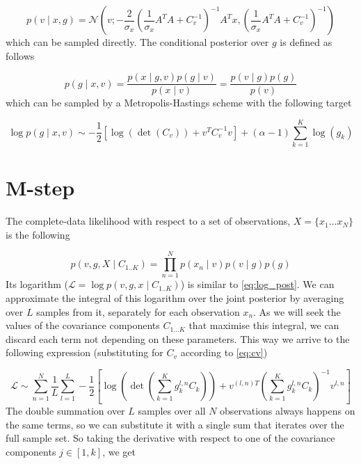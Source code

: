 \documentclass{paper}
\begin{document}
\begin{equation}
p(v \mid x,g) = \mathcal{N}\left(v; -\frac{2}{\sigma_x} \left(\frac{1}{\sigma_x} A^T A + C_v^{-1}\right)^{-1} A^T x, \left(\frac{1}{\sigma_x} A^T A + C_v^{-1}\right)^{-1}\right)
\end{equation}
%
which can be sampled directly. The conditional posterior over $g$ is defined as follows

\begin{equation} 
p(g \mid x,v) = \frac{p(x \mid g,v) p(g \mid v)}{p(x \mid v)} = \frac{p(v \mid g) p(g)}{p(v)}
\end{equation}
%
which can be sampled by a Metropolis-Hastings scheme with the following target

\begin{equation} 
\log p(g \mid x,v) \sim -\frac{1}{2} \left[\log(\det(C_v)) + v^T C_v^{-1} v\right] + (\alpha-1) \sum_{k=1}^K \log(g_k)
\end{equation}

\section{M-step}

The complete-data likelihood with respect to a set of observations, $X = \lbrace x_1 \dots x_N \rbrace$ is the following

\begin{equation}
p(v,g,X \mid C_{1..K}) = \prod_{n=1}^N p(x_n \mid v) p(v \mid g) p(g)
\end{equation}
%
Its logarithm ($\mathcal{L}=\log p(v,g,x \mid C_{1..K})$) is similar to \ref{eq:log_post}. We can approximate the integral of this logarithm over the joint posterior by averaging over $L$ samples from it, separately for each observation $x_n$. As we will seek the values of the covariance components $C_{1 \dots K}$ that maximise this integral, we can discard each term not depending on these parameters. This way we arrive to the following expression (substituting for $C_v$ according to \ref{eq:cv})

\begin{equation}
\mathcal{L} \sim \sum_{n=1}^N \frac{1}{L} \sum_{l=1}^L -\frac{1}{2} \left[\log \left( \det \left( \sum_{k=1}^K g_k^{l,n} C_k \right) \right) + v^{(l,n)T}  \left( \sum_{k=1}^K g_k^{l,n} C_k \right)^{-1} v^{l,n}\right]
\end{equation}
%
The double summation over $L$ samples over all $N$ observations always happens on the same terms, so we can substitute it with a single sum that iterates over the full sample set. So taking the derivative with respect to one of the covariance components $j \in \left[ 1,k \right]$, we get
\end{document}
